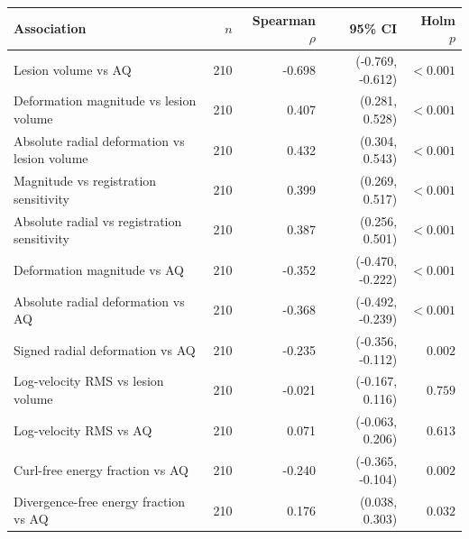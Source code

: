 \begin{tabular}{lrrrr}
\toprule
Association & $n$ & Spearman $\rho$ & 95\% CI & Holm $p$ \\
\midrule
Lesion volume vs AQ & 210 & -0.698 & (-0.769, -0.612) & \(<0.001\) \\
Deformation magnitude vs lesion volume & 210 & 0.407 & (0.281, 0.528) & \(<0.001\) \\
Absolute radial deformation vs lesion volume & 210 & 0.432 & (0.304, 0.543) & \(<0.001\) \\
Magnitude vs registration sensitivity & 210 & 0.399 & (0.269, 0.517) & \(<0.001\) \\
Absolute radial vs registration sensitivity & 210 & 0.387 & (0.256, 0.501) & \(<0.001\) \\
Deformation magnitude vs AQ & 210 & -0.352 & (-0.470, -0.222) & \(<0.001\) \\
Absolute radial deformation vs AQ & 210 & -0.368 & (-0.492, -0.239) & \(<0.001\) \\
Signed radial deformation vs AQ & 210 & -0.235 & (-0.356, -0.112) & \(0.002\) \\
Log-velocity RMS vs lesion volume & 210 & -0.021 & (-0.167, 0.116) & \(0.759\) \\
Log-velocity RMS vs AQ & 210 & 0.071 & (-0.063, 0.206) & \(0.613\) \\
Curl-free energy fraction vs AQ & 210 & -0.240 & (-0.365, -0.104) & \(0.002\) \\
Divergence-free energy fraction vs AQ & 210 & 0.176 & (0.038, 0.303) & \(0.032\) \\
\bottomrule
\end{tabular}
